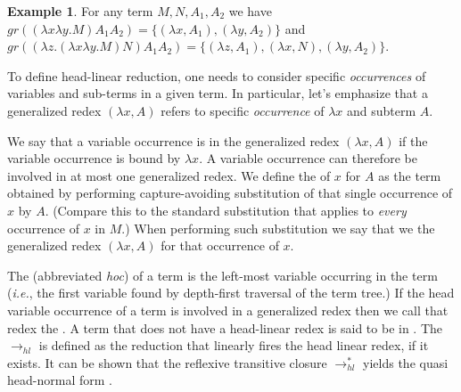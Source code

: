 \documentclass{elsarticle}
\makeatletter
\theoremstyle{plain}
\theoremstyle{definition}
\newtheorem{example}{Example}[section]
\theoremstyle{remark}
\renewcommand\ie{{\it i.e.\@\xspace}}
\newcommand{\hlred}{\rightarrow_{hl}}
\makeatother
\begin{document}
\begin{example} For any term $M, N, A_1, A_2$ we have
$gr((\lambda x \lambda y . M) A_1 A_2) = \{ (\lambda x, A_1), (\lambda y, A_2)\}$ and
 $gr((\lambda z . (\lambda x \lambda y . M) N) A_1 A_2) = \{ (\lambda z, A_1), (\lambda x, N), (\lambda y, A_2)\}$.
\end{example}

To define head-linear reduction, one needs to consider specific \emph{occurrences} of variables and sub-terms in a given term. In particular, let's emphasize that a generalized redex  $(\lambda x, A)$ refers to specific \emph{occurrence} of $\lambda x$ and subterm $A$.

We say that a variable occurrence is  in the generalized redex $(\lambda x, A)$ if the variable occurrence is bound by $\lambda x$. A variable occurrence can therefore be involved in at most one generalized redex. We define the  of $x$ for $A$ as the term obtained by performing capture-avoiding substitution of that single occurrence of $x$ by $A$. (Compare this to the standard substitution that applies to \emph{every} occurrence of $x$ in $M$.) When performing such substitution we say that we  the generalized redex $(\lambda x, A)$ for that occurrence of $x$.

The  (abbreviated \emph{hoc}) of a term is the left-most variable occurring in the term (\ie, the first variable found by depth-first traversal of the term tree.) If the head variable occurrence of a term is involved in a generalized redex then we call that redex the .
A term that does not have a head-linear redex is said to be in .
The  $\hlred$ is defined as the reduction that linearly fires the head linear redex, if it exists. It can be shown that the reflexive transitive closure $\rightarrow^*_{hl}$ yields the quasi head-normal form \cite{danos-head,danosherbelinregnier1996}.
\end{document}
